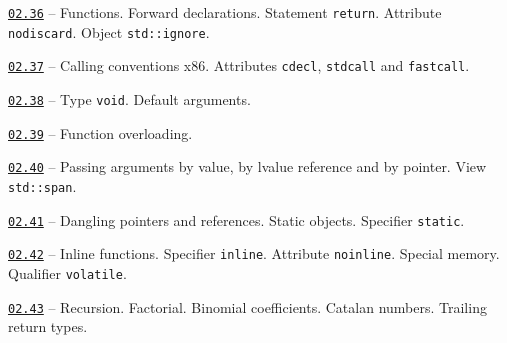 \documentclass[a4paper,12pt]{article}
\renewenvironment{itemize}
{
    \begin{list}{\labelitemi}
    {
      \setlength{\topsep}{0pt}
      \setlength{\partopsep}{0pt}
      \setlength{\parskip}{0pt}
      \setlength{\itemsep}{0pt}
      \setlength{\parsep}{0pt}
      \setlength{\leftmargin}{14.5pt}
    }
}{\end{list}}
\begin{document}
\begin{itemize}

    \item \href{https://github.com/i-s-m-mipt/Education/blob/master/projects/examples/source/02.36.cpp}{\texttt{02.36}} -- Functions. Forward declarations. Statement \lstinline{return}. Attribute \lstinline{nodiscard}. Object \lstinline{std::ignore}.

    \smallskip

    \item \href{https://github.com/i-s-m-mipt/Education/blob/master/projects/examples/source/02.37.cpp}{\texttt{02.37}} -- Calling conventions x86. Attributes \lstinline{cdecl}, \lstinline{stdcall} and \lstinline{fastcall}.

    \smallskip

    \item \href{https://github.com/i-s-m-mipt/Education/blob/master/projects/examples/source/02.38.cpp}{\texttt{02.38}} -- Type \lstinline{void}. Default arguments.

    \smallskip

    \item \href{https://github.com/i-s-m-mipt/Education/blob/master/projects/examples/source/02.39.cpp}{\texttt{02.39}} -- Function overloading.

    \smallskip

    \item \href{https://github.com/i-s-m-mipt/Education/blob/master/projects/examples/source/02.40.cpp}{\texttt{02.40}} -- Passing arguments by value, by lvalue reference and by pointer. View \lstinline{std::span}.

    \smallskip

    \item \href{https://github.com/i-s-m-mipt/Education/blob/master/projects/examples/source/02.41.cpp}{\texttt{02.41}} -- Dangling pointers and references. Static objects. Specifier \lstinline{static}.

    \smallskip
    
    \item \href{https://github.com/i-s-m-mipt/Education/blob/master/projects/examples/source/02.42.cpp}{\texttt{02.42}} -- Inline functions. Specifier \lstinline{inline}. Attribute \lstinline{noinline}. Special memory. Qualifier \lstinline{volatile}.

    \smallskip

    \item \href{https://github.com/i-s-m-mipt/Education/blob/master/projects/examples/source/02.43.cpp}{\texttt{02.43}} -- Recursion. Factorial. Binomial coefficients. Catalan numbers. Trailing return types.


\end{itemize}
\end{document}

